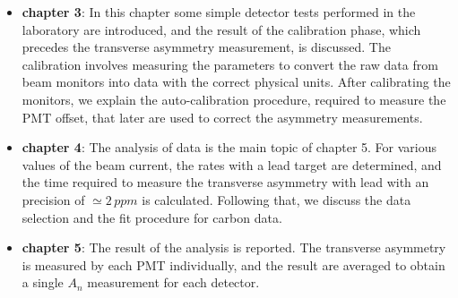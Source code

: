 \begin{itemize}
\item \textbf{chapter 3}: In this chapter some simple detector tests performed in the laboratory are introduced, and the result of the calibration phase, which precedes the transverse asymmetry measurement, is discussed. The calibration involves measuring the parameters to convert the raw data from beam monitors into data with the correct physical units. After calibrating the monitors, we explain the auto-calibration procedure, required to measure the PMT offset, that later are used to correct the asymmetry measurements.
\item \textbf{chapter 4}: The analysis of data is the main topic of chapter 5. For various values of the beam current, the rates with a lead target are determined, and the time required to measure the transverse asymmetry with lead with an precision of $\simeq 2 \, ppm$ is calculated. Following that, we discuss the data selection and the fit procedure for carbon data.
\item \textbf{chapter 5}: The result of the analysis is reported. The transverse asymmetry is measured by each PMT individually, and the result are averaged to obtain a single $A_{n}$ measurement for each detector.  
\end{itemize}